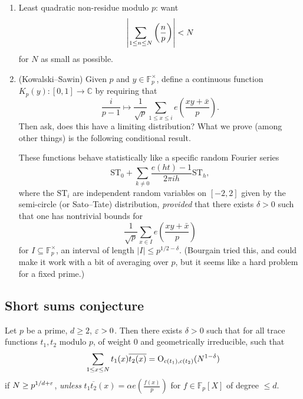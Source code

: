 \documentclass[reqno]{amsart} 
\numberwithin{theorem}{section}
\numberwithin{equation}{section}
\begin{document}
\begin{enumerate}
\item Least quadratic non-residue modulo $p$: want
  \begin{equation*}
    \left\lvert \sum_{1 \leq n \leq N}
      \left( \frac{n}{p} \right)\right\rvert < N
  \end{equation*}
  for $N$ as small as possible.
\item (Kowalski--Sawin)
  Given $p$ and $y \in \mathbb{F}_p^\times$, define a continuous function $K_p(y) :[0, 1] \rightarrow \mathbb{C}$ by requiring that
  \begin{equation*}
    \frac{i}{p - 1}
    \mapsto \frac{1}{\sqrt{p}}
    \sum_{1 \leq x \leq i
    }
    e \left( \frac{x y + \bar{x}}{p} \right).
  \end{equation*}
  Then ask, does this have a limiting distribution?  What we prove (among other things) is the following conditional result.

  These functions behave statistically like a specific random Fourier series
  \begin{equation*}
    \mathrm{S T}_0
    + \sum_{k \neq 0}
    \frac{e(h t) - 1}{2 \pi i h}
    \mathrm{S T}_h,
  \end{equation*}
  where the $\mathrm{S T}_i$ are independent random variables on $[-2,2]$ given by the semi-circle (or Sato--Tate) distribution, \emph{provided} that there exists $\delta > 0$ such that one has nontrivial bounds for
  \begin{equation*}
    \frac{1}{\sqrt{p}} \sum_{x \in I} e \left( \frac{x y + \bar{x}}{p} \right)
  \end{equation*}
  for $I \subseteq \mathbb{F}_p^\times$, an interval of length $\lvert I \rvert \leq p^{1/2 - \delta}$.  (Bourgain tried this, and could make it work with a bit of averaging over $p$, but it seems like a hard problem for a fixed prime.)
\end{enumerate}

\subsection{Short sums conjecture}

\begin{conjecture}
  Let $p$ be a prime, $d \geq 2$, $\varepsilon > 0$.  Then there exists $\delta > 0$ such that for all trace functions  $t_1, t_2$ modulo $p$, of weight $0$ and geometrically irreducible, such that
  \begin{equation*}
    \sum_{1 \leq x \leq N} t_1(x) \overline{t_2(x)}
    = \operatorname{O}_{c(t_1), c(t_2)}(N^{1 - \delta})
  \end{equation*}
  if $N \geq p^{1/d + \varepsilon}$, \emph{unless} $t_1 \overline{t_2}(x) = \alpha e \left( \frac{f(x)}{p} \right)$ for $f \in \mathbb{F}_p[X]$ of degree $\leq d$.
\end{conjecture}
\end{document}
